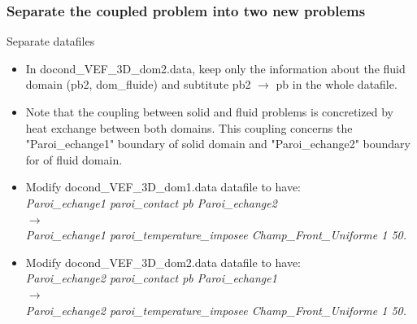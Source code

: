 \documentclass[10pt, hyperref={unicode=true,pdfusetitle, bookmarks=true,bookmarksnumbered=false,bookmarksopen=false, breaklinks=false,pdfborder={0 0 1},backref=true,colorlinks=true,linkcolor=darkblue,pageanchor, urlcolor=darkblue}]{beamer}
\begin{document}
\begin{frame}
\frametitle{Separate the coupled problem into two new problems}
\begin{block}{Separate datafiles}

\begin{itemize}
\item In docond\_VEF\_3D\_dom2.data, keep only the information about the fluid domain (pb2, dom\_fluide) and subtitute pb2 $\rightarrow$ pb in the whole datafile.
\item Note that the coupling between solid and fluid problems is concretized by heat exchange between both domains. This coupling concerns the "Paroi\_echange1" boundary of solid domain and "Paroi\_echange2" boundary for of fluid domain.
\item Modify docond\_VEF\_3D\_dom1.data datafile to have:\\
\textit{Paroi\_echange1 paroi\_contact pb Paroi\_echange2} \\
$\rightarrow$ \\
\textit{Paroi\_echange1 paroi\_temperature\_imposee Champ\_Front\_Uniforme 1 50.}
\item Modify docond\_VEF\_3D\_dom2.data datafile to have:\\
\textit{Paroi\_echange2 paroi\_contact pb Paroi\_echange1} \\
$\rightarrow$ \\
\textit{Paroi\_echange2 paroi\_temperature\_imposee Champ\_Front\_Uniforme 1 50.}
\end{itemize}

\end{block}
\end{frame}
\end{document}
